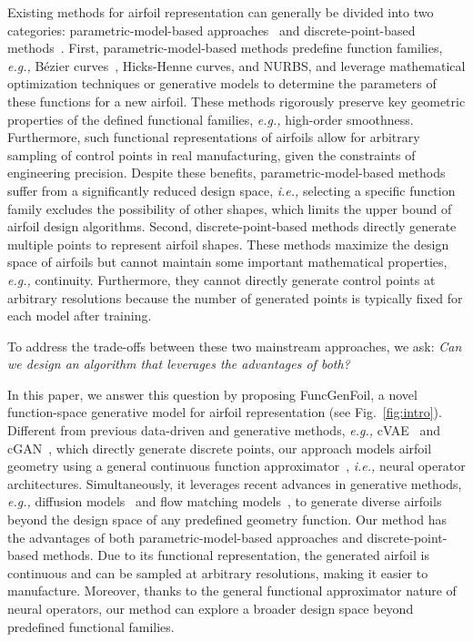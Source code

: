 Existing methods for airfoil representation can generally be divided into two categories: parametric-model-based approaches~\cite{xie2024parametric} and discrete-point-based methods~\cite{liu2024afbench,sekar2019inverse}. First, parametric-model-based methods predefine function families, \emph{e.g.,} Bézier curves~\cite{chen2021bezierganautomaticgenerationsmooth}, Hicks-Henne curves, and NURBS, and leverage mathematical optimization techniques or generative models to determine the parameters of these functions for a new airfoil. These methods rigorously preserve key geometric properties of the defined functional families, \emph{e.g.,} high-order smoothness. Furthermore, such functional representations of airfoils allow for arbitrary sampling of control points in real manufacturing, given the constraints of engineering precision. Despite these benefits, parametric-model-based methods suffer from a significantly reduced design space, \emph{i.e.,} selecting a specific function family excludes the possibility of other shapes, which limits the upper bound of airfoil design algorithms. 
Second, discrete-point-based methods directly generate multiple points to represent airfoil shapes. These methods maximize the design space of airfoils but cannot maintain some important mathematical properties, \emph{e.g.,} continuity. Furthermore, they cannot directly generate control points at arbitrary resolutions because the number of generated points is typically fixed for each model after training.

To address the trade-offs between these two mainstream approaches, we ask: \emph{Can we design an algorithm that leverages the advantages of both?}

In this paper, we answer this question by proposing FuncGenFoil, a novel function-space generative model for airfoil representation (see Fig.~\ref{fig:intro}). Different from previous data-driven and generative methods, \emph{e.g.,} cVAE~\cite{kingma2013auto} and cGAN~\cite{mirza2014conditional}, which directly generate discrete points, our approach models airfoil geometry using a general continuous function approximator~\cite{anandkumar2019neural,li2021fourier,Kovachki2023,azizzadenesheli2024neural}, \emph{i.e.,} neural operator architectures. Simultaneously, it leverages recent advances in generative methods, \emph{e.g.,} diffusion models~\cite{Ho2020} and flow matching models~\cite{lipman2022flow}, to generate diverse airfoils beyond the design space of any predefined geometry function. 
Our method has the advantages of both parametric-model-based approaches and discrete-point-based methods. Due to its functional representation, the generated airfoil is continuous and can be sampled at arbitrary resolutions, making it easier to manufacture. Moreover, thanks to the general functional approximator nature of neural operators, our method can explore a broader design space beyond predefined functional families.

